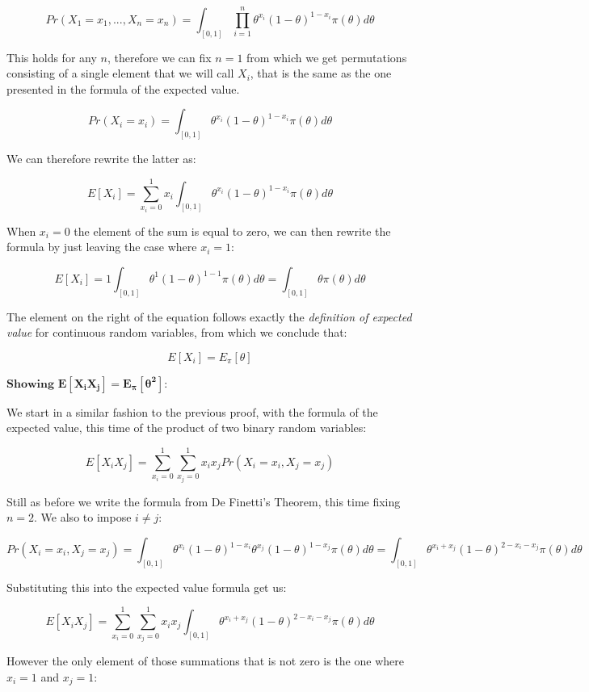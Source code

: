 \documentclass[
]{article}
\begin{document}
\[
Pr(X_1=x_1,...,X_n=x_n) = 
\int_{[0,1]} \prod_{i=1}^n\theta^{x_i}(1 - \theta)^{1 - x_i} \pi(\theta)d\theta
\]

This holds for any \(n\), therefore we can fix \(n = 1\) from which we
get permutations consisting of a single element that we will call
\(X_i\), that is the same as the one presented in the formula of the
expected value.

\[
Pr(X_i=x_i) = 
\int_{[0,1]} \theta^{x_i}(1 - \theta)^{1 - x_i} \pi(\theta)d\theta
\]

We can therefore rewrite the latter as:

\[
E[X_i] = 
\sum_{x_i=0}^1x_i\int_{[0,1]} \theta^{x_i}(1 - \theta)^{1 - x_i} \pi(\theta)d\theta
\]

When \(x_i = 0\) the element of the sum is equal to zero, we can then
rewrite the formula by just leaving the case where \(x_i = 1\):

\[
E[X_i] = 1\int_{[0,1]} \theta^{1}(1 - \theta)^{1 - 1} \pi(\theta)d\theta
= \int_{[0,1]} \theta \pi(\theta)d\theta
\]

The element on the right of the equation follows exactly the
\emph{definition of expected value} for continuous random variables,
from which we conclude that:

\[
E[X_i] = E_\pi[\theta]
\]

\(\textbf{Showing } \mathbf{E[X_iX_j]=E_{\pi}[\theta^2]}\):

We start in a similar fashion to the previous proof, with the formula of
the expected value, this time of the product of two binary random
variables:

\[
E[X_iX_j] = 
\sum_{x_i=0}^1\sum_{x_j=0}^1x_ix_jPr(X_i=x_i,X_j=x_j)
\]

Still as before we write the formula from De Finetti's Theorem, this
time fixing \(n = 2\). We also to impose \(i \neq j\):

\[
Pr(X_i=x_i,X_j=x_j) = \int_{[0,1]} \theta^{x_i}(1 - \theta)^{1 - x_i} \theta^{x_j}(1 - \theta)^{1 - x_j} \pi(\theta)d\theta
= \int_{[0,1]} \theta^{x_i + x_j}(1 - \theta)^{2 - x_i - x_j} \pi(\theta)d\theta
\]

Substituting this into the expected value formula get us:

\[
E[X_iX_j] =
\sum_{x_i=0}^1\sum_{x_j=0}^1x_ix_j\int_{[0,1]} \theta^{x_i + x_j}(1 - \theta)^{2 - x_i - x_j} \pi(\theta)d\theta
\]

However the only element of those summations that is not zero is the one
where \(x_i = 1\) and \(x_j = 1\):
\end{document}
